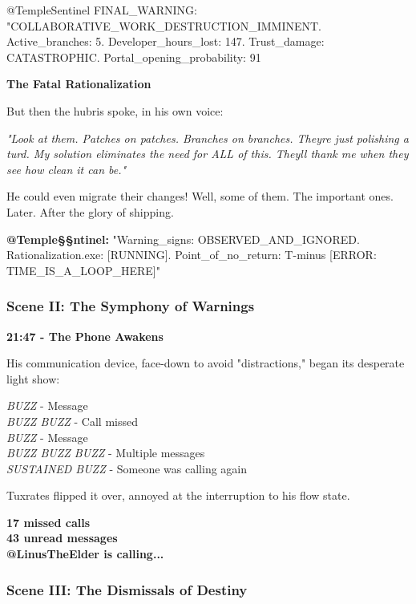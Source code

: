 \begin{codeblock}
@TempleSentinel FINAL_WARNING: "COLLABORATIVE_WORK_DESTRUCTION_IMMINENT. Active_branches: 5. Developer_hours_lost: 147. Trust_damage: CATASTROPHIC. Portal_opening_probability: 91%
\end{codeblock}

\textbf{The Fatal Rationalization}

But then the hubris spoke, in his own voice:

\emph{"Look at them. Patches on patches. Branches on branches. They\textquotesingle re just polishing a turd. My solution eliminates the need for ALL of this. They\textquotesingle ll thank me when they see how clean it can be."}

He could even migrate their changes! Well, some of them. The important ones. Later. After the glory of shipping.

\textbf{@Temple§§ntinel:} "Warning\_signs: OBSERVED\_AND\_IGNORED. Rationalization.exe: {[}RUNNING{]}. Point\_of\_no\_return: T-minus {[}ERROR: TIME\_IS\_A\_LOOP\_HERE{]}"

\bookdivider

\subsubsection{Scene II: The Symphony of Warnings}\label{scene-ii-the-symphony-of-warnings}

\textbf{21:47 - The Phone Awakens}

His communication device, face-down to avoid "distractions," began its desperate light show:

\emph{BUZZ} - Message\\
\emph{BUZZ BUZZ} - Call missed\\
\emph{BUZZ} - Message\\
\emph{BUZZ BUZZ BUZZ} - Multiple messages\\
\emph{SUSTAINED BUZZ} - Someone was calling again

Tuxrates flipped it over, annoyed at the interruption to his flow state.

\textbf{17 missed calls}\\
\textbf{43 unread messages}\\
\textbf{@LinusTheElder is calling...}

\bookdivider

\subsubsection{Scene III: The Dismissals of Destiny}\label{scene-iii-the-dismissals-of-destiny}

